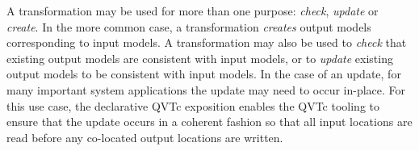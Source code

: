 A transformation may be used for more than one purpose: \textit{check}, \textit{update} or \textit{create}. In the more common case, a transformation \textit{creates} output models corresponding to input models. A transformation may also be used to \textit{check} that existing output models are consistent with input models, or to \textit{update} existing output models to be consistent with input models. In the case of an update, for many important system applications the update may need to occur in-place. For this use case, the declarative QVTc exposition enables the QVTc tooling to ensure that the update occurs in a coherent fashion so that all input locations are read before any co-located output locations are written.
